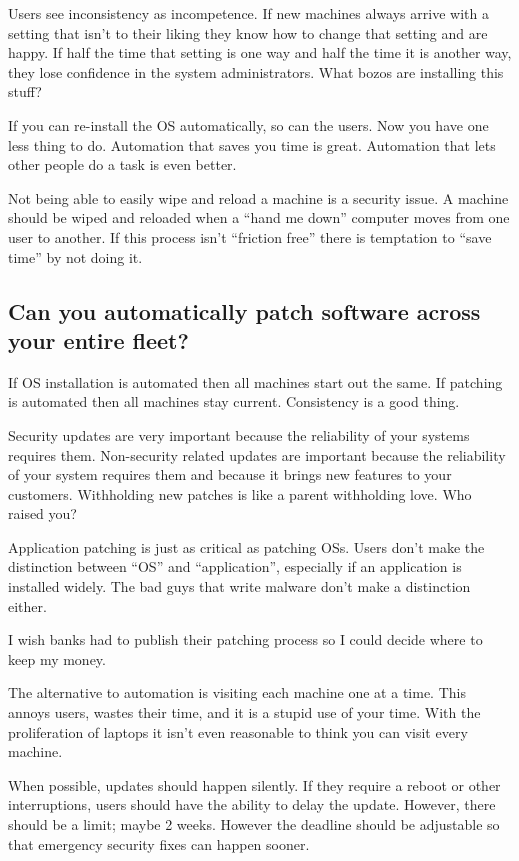 \documentclass{article}
\begin{document}
Users see inconsistency as incompetence. If new machines always arrive with a setting that isn't to their liking they know how to change that setting and are happy. If half the time that setting is one way and half the time it is another way, they lose confidence in the system administrators. What bozos are installing this stuff?

If you can re-install the OS automatically, so can the users. Now you have one less thing to do. Automation that saves you time is great. Automation that lets other people do a task is even better.

Not being able to easily wipe and reload a machine is a security issue. A machine should be wiped and reloaded when a ``hand me down'' computer moves from one user to another. If this process isn't ``friction free'' there is temptation to ``save time'' by not doing it.

\subsection{Can you automatically patch software across your entire fleet?}
If OS installation is automated then all machines start out the same. If patching is automated then all machines stay current. Consistency is a good thing.

Security updates are very important because the reliability of your systems requires them. Non-security related updates are important because the reliability of your system requires them and because it brings new features to your customers. Withholding new patches is like a parent withholding love. Who raised you?

Application patching is just as critical as patching OSs. Users don't make the distinction between ``OS'' and ``application'', especially if an application is installed widely. The bad guys that write malware don't make a distinction either.

I wish banks had to publish their patching process so I could decide where to keep my money.

The alternative to automation is visiting each machine one at a time. This annoys users, wastes their time, and it is a stupid use of your time. With the proliferation of laptops it isn't even reasonable to think you can visit every machine.

When possible, updates should happen silently. If they require a reboot or other interruptions, users should have the ability to delay the update. However, there should be a limit; maybe 2 weeks. However the deadline should be adjustable so that emergency security fixes can happen sooner.
\end{document}
